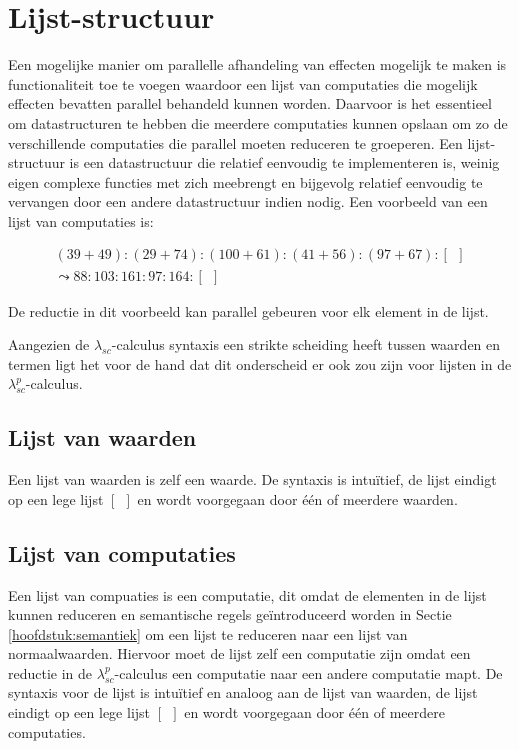 \section{Lijst-structuur}
Een mogelijke manier om parallelle afhandeling van effecten mogelijk te maken is functionaliteit toe te voegen waardoor een lijst van computaties die mogelijk effecten bevatten parallel behandeld kunnen worden. Daarvoor is het essentieel om datastructuren te hebben die meerdere computaties kunnen opslaan om zo de verschillende computaties die parallel moeten reduceren te groeperen. Een lijst-structuur is een datastructuur die relatief eenvoudig te implementeren is, weinig eigen complexe functies met zich meebrengt en bijgevolg relatief eenvoudig te vervangen door een andere datastructuur indien nodig. Een voorbeeld van een lijst van computaties is: 

\begin{equation} \label{eq:listEx}
    \begin{split}
    (39 + 49):(29 + 74):(100 + 61):(41 + 56):(97 + 67):[\:\:] \\
    \leadsto 88:103:161:97:164:[\:\:]
    \end{split}
\end{equation} 

De reductie in dit voorbeeld kan parallel gebeuren voor elk element in de lijst. \newline

Aangezien de $\lambda_{sc}$-calculus syntaxis een strikte scheiding heeft tussen waarden en termen ligt het voor de hand dat dit onderscheid er ook zou zijn voor lijsten in de $\lambda_{sc}^{p}$-calculus.

\subsection{Lijst van waarden}
Een lijst van waarden is zelf een waarde. De syntaxis is intuïtief, de lijst eindigt op een lege lijst $[\:\:]$ en wordt voorgegaan door één of meerdere waarden.

\subsection{Lijst van computaties}
Een lijst van compuaties is een computatie, dit omdat de elementen in de lijst kunnen reduceren en semantische regels geïntroduceerd worden in Sectie \ref{hoofdstuk:semantiek} om een lijst te reduceren naar een lijst van normaalwaarden. Hiervoor moet de lijst zelf een computatie zijn omdat een reductie in de $\lambda_{sc}^{p}$-calculus een computatie naar een andere computatie mapt. De syntaxis voor de lijst is intuïtief en analoog aan de lijst van waarden, de lijst eindigt op een lege lijst $[\:\:]$ en wordt voorgegaan door één of meerdere computaties.

